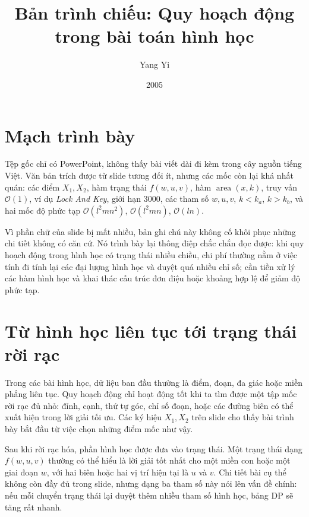 \documentclass[11pt]{article}
\title{Bản trình chiếu: Quy hoạch động trong bài toán hình học}
\author{Yang Yi}
\date{2005}
\newcommand{\Oh}{\mathcal{O}}
\begin{document}
\maketitle


\section{Mạch trình bày}

Tệp gốc chỉ có PowerPoint, không thấy bài viết dài đi kèm trong cây nguồn
tiếng Việt. Văn bản trích được từ slide tương đối ít, nhưng các mốc còn lại
khá nhất quán: các điểm \(X_1,X_2\), hàm trạng thái \(f(w,u,v)\), hàm
\(\operatorname{area}(x,k)\), truy vấn \(\Oh(1)\), ví dụ \textit{Lock And
Key}, giới hạn \(3000\), các tham số \(w,u,v\), \(k<k_a\), \(k>k_b\), và hai
mốc độ phức tạp \(\Oh(l^2mn^2)\), \(\Oh(l^2mn)\), \(\Oh(ln)\).

Vì phần chữ của slide bị mất nhiều, bản ghi chú này không cố khôi phục những
chi tiết không có căn cứ. Nó trình bày lại thông điệp chắc chắn đọc được:
khi quy hoạch động trong hình học có trạng thái nhiều chiều, chi phí thường
nằm ở việc tính đi tính lại các đại lượng hình học và duyệt quá nhiều chỉ số;
cần tiền xử lý các hàm hình học và khai thác cấu trúc đơn điệu hoặc khoảng
hợp lệ để giảm độ phức tạp.

\section{Từ hình học liên tục tới trạng thái rời rạc}

Trong các bài hình học, dữ liệu ban đầu thường là điểm, đoạn, đa giác hoặc
miền phẳng liên tục. Quy hoạch động chỉ hoạt động tốt khi ta tìm được một tập
mốc rời rạc đủ nhỏ: đỉnh, cạnh, thứ tự góc, chỉ số đoạn, hoặc các đường biên
có thể xuất hiện trong lời giải tối ưu. Các ký hiệu \(X_1,X_2\) trên slide
cho thấy bài trình bày bắt đầu từ việc chọn những điểm mốc như vậy.

Sau khi rời rạc hóa, phần hình học được đưa vào trạng thái. Một trạng thái
dạng \(f(w,u,v)\) thường có thể hiểu là lời giải tốt nhất cho một miền con
hoặc một giai đoạn \(w\), với hai biên hoặc hai vị trí hiện tại là \(u\) và
\(v\). Chi tiết bài cụ thể không còn đầy đủ trong slide, nhưng dạng ba tham
số này nói lên vấn đề chính: nếu mỗi chuyển trạng thái lại duyệt thêm nhiều
tham số hình học, bảng DP sẽ tăng rất nhanh.
\end{document}
